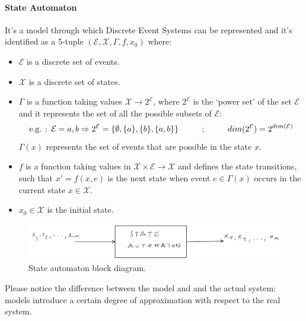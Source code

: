 \documentclass[12pt,a4paper]{article}
\begin{document}
\paragraph{State Automaton} It’s a model through which Discrete Event Systems can be represented and it’s identified as a 5-tuple $(\mathcal{E},\mathcal{X},\Gamma,f,x_0)$ where:
\begin{itemize}
\item $\mathcal{E}$ is a discrete set of events.
\item $\mathcal{X}$ is a discrete set of states.
\item $\Gamma$ is a function taking values $\mathcal{X}\rightarrow 2^\mathcal{E}$, where $2^\mathcal{E}$ is the `power set’ of the set $\mathcal{E}$ and it represents the set of all the possible subsets of $\mathcal{E}$:
$$
\text{e.g. : }\mathcal{E}={a,b} \Rightarrow 2^\mathcal{E}=\{\emptyset, \{a\}, \{b\}, \{a,b\}\} \text{\hspace{1 cm};\hspace{1 cm}} dim(2^\mathcal{E}) = 2^{dim(\mathcal{E})}
$$
$\Gamma(x)$ represents the set of events that are possible in the state $x$. 
\item $f$ is a function taking values in $\mathcal{X}\times\mathcal{E}\rightarrow\mathcal{X}$ and defines the state transitions, such that $x' = f(x,e)$ is the next state when event $e\in\Gamma(x)$ occurs in the current state $x\in\mathcal{X}$.
\item $x_0\in\mathcal{X}$ is the initial state.
\end{itemize}
\begin{figure}[H]
	\centering
	\includegraphics[width=\textwidth]{IMG/stateAut.png}
	\caption{State automaton block diagram.}
	\label{fig:stateAut}
\end{figure}
Please notice the difference between the model and and the actual system: models introduce a certain degree of approximation with respect to the real system.
\end{document}
